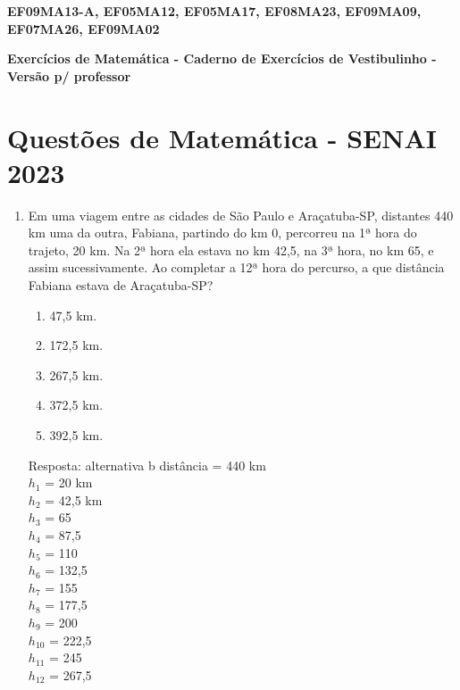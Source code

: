 \documentclass[a4paper,14pt]{article}
\begin{document}
	
	\noindent\textbf{EF09MA13-A, EF05MA12, EF05MA17, EF08MA23, EF09MA09, EF07MA26, EF09MA02}
	
	\begin{center}
		\textbf{Exercícios de Matemática - Caderno de Exercícios de Vestibulinho - Versão p/ professor}
	\end{center}
	
	\bigskip
	
	
	\bigskip
	\section*{Questões de Matemática - SENAI 2023}
	
	\begin{enumerate}
		\item Em uma viagem entre as cidades de São Paulo e Araçatuba-SP, distantes 440 km uma da outra, Fabiana,
		partindo do km 0, percorreu na 1ª hora do trajeto, 20 km. Na 2ª hora ela estava no km 42,5, na 3ª hora,
		no km 65, e assim sucessivamente. 
		\newline
		Ao completar a 12ª hora do percurso, a que distância Fabiana estava de Araçatuba-SP?
		\begin{enumerate}
			\item 47,5 km.
			\item 172,5 km.
			\item 267,5 km.
			\item 372,5 km.
			\item 392,5 km.
		\end{enumerate}
		Resposta: alternativa b
		\newline
		distância = 440 km \\
		$h_{1}$ = 20 km \\
		$h_{2}$ = 42,5 km \\
		$h_{3}$ = 65 \\
		$h_{4}$ = 87,5 \\
		$h_{5}$ = 110 \\ 
		$h_{6}$ = 132,5 \\
		$h_{7}$ = 155 \\
		$h_{8}$ = 177,5 \\
		$h_{9}$ = 200 \\
		$h_{10}$ = 222,5 \\
		$h_{11}$ = 245 \\
		$h_{12}$ = 267,5 \\
		

\end{enumerate}
\end{document}
